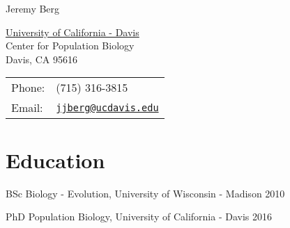 \documentclass[letterpaper]{article}
\def\name{Jeremy Berg}
\renewenvironment{itemize}{
  \begin{list}{}{
    \setlength{\leftmargin}{1.5em}
  }
}{
  \end{list}
}
\begin{document}
{\huge \name}


\vspace{0.25in}

\begin{minipage}{0.45\linewidth}
  \href{http://www.ucdavis.edu/}{University of California - Davis} \\
  Center for Population Biology \\
  Davis, CA 95616
\end{minipage}
\begin{minipage}{0.45\linewidth}
  \begin{tabular}{ll}
    Phone: & (715) 316-3815 \\
    Email: & \href{jjberg@ucdavis.edu}{\tt jjberg@ucdavis.edu} \\
  \end{tabular}
\end{minipage}

\section*{Education}
\begin{itemize}
 \item BSc Biology - Evolution, University of Wisconsin - Madison  2010
 \item PhD Population Biology, University of California - Davis  2016
 \end{itemize}

%
%
\end{document}
